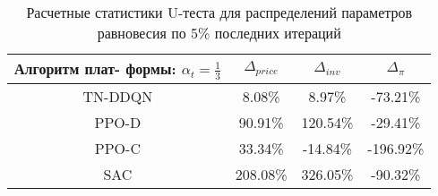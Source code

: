 \bgroup
\def\arraystretch{1.25}
\begin{table}[H]
	\caption{Расчетные статистики U-теста для распределений параметров равновесия по 5\% последних итераций}
	\label{tables:U_fixed}
	\begin{center}
		\vspace{-0.5em}
		\begin{tabular}{c||ccc}
			\toprule
			\makecell{Алгоритм плат-\\ формы: $\alpha_t = \frac{1}{3}$} & $\Delta_{price}$ & $\Delta_{inv}$ & $\Delta_{\pi}$ \\
			\midrule
			TN-DDQN & 8.08\% & 8.97\% & -73.21\% \\
			PPO-D & 90.91\% & 120.54\% & -29.41\% \\
			PPO-C & 33.34\% & -14.84\% & -196.92\% \\
			SAC & 208.08\% & 326.05\% & -90.32\% \\
			\bottomrule
		\end{tabular}
	\end{center}
\end{table}
\egroup